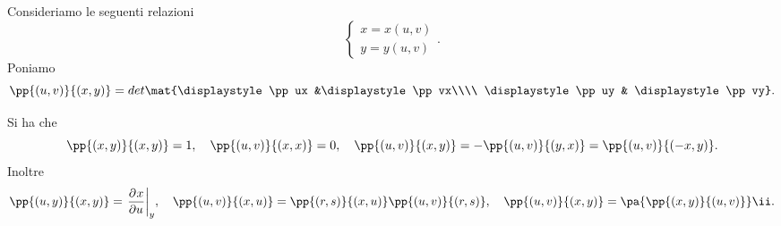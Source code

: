 \documentclass[a4paper]{report}
\begin{document}
\noindent Consideriamo le seguenti relazioni
\[\begin{cases}
x=x(u,v)\\
y=y(u,v)
\end{cases}.\]
Poniamo
\[\pp{(u,v)}{(x,y)}=det{\mat{\displaystyle\pp ux &\displaystyle\pp vx\\\\ \displaystyle\pp uy & \displaystyle\pp vy}}.\]
\begin{remark}\label{JacobianeNotevoli}
Si ha che
\[\pp{(x,y)}{(x,y)}=1,\quad \pp{(u,v)}{(x,x)}=0,\quad \pp{(u,v)}{(x,y)}=-\pp{(u,v)}{(y,x)}=\pp{(u,v)}{(-x,y)}.\]
Inoltre
\[\pp{(u,y)}{(x,y)}=\ppb uxy,\quad \pp{(u,v)}{(x,u)}=\pp{(r,s)}{(x,u)}\pp{(u,v)}{(r,s)},\quad \pp{(u,v)}{(x,y)}=\pa{\pp{(x,y)}{(u,v)}}\ii.\]
\end{remark}

%
\end{document}

